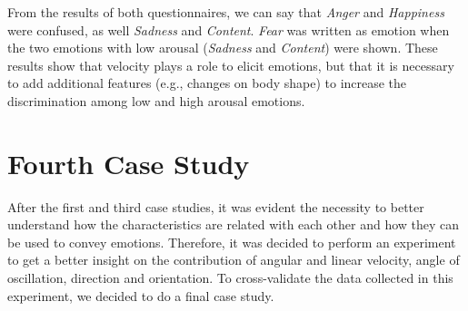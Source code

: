 From the results of both questionnaires, we can say that \textit{Anger} and \textit{Happiness} were confused, as well \textit{Sadness} and \textit{Content}. \textit{Fear} was written as emotion when the two emotions with low arousal (\textit{Sadness} and \textit{Content}) were shown. These results show that velocity plays a role to elicit emotions, but that it is necessary to add additional features (e.g., changes on body shape) to increase the discrimination among low and high arousal emotions.
\section{Fourth Case Study}
After the first and third case studies, it was evident the necessity to better understand how the characteristics are related with each other and how they can be used to convey emotions. Therefore, it was decided to perform an experiment to get a better insight on the contribution of angular and linear velocity, angle of oscillation, direction and orientation. To cross-validate the data collected in this experiment, we decided to do a final case study.
